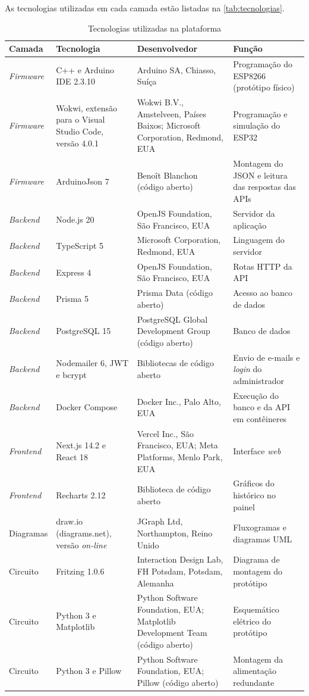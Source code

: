 As tecnologias utilizadas em cada camada estão listadas na
\autoref{tab:tecnologias}.

\begin{table}[H]
\centering
\caption{Tecnologias utilizadas na plataforma}
\label{tab:tecnologias}
\small
\begin{tabular}{p{1.7cm}p{3.4cm}p{4.6cm}p{4.3cm}}
\hline
\textbf{Camada} & \textbf{Tecnologia} & \textbf{Desenvolvedor} & \textbf{Função} \\
\hline
\textit{Firmware} & C++ e Arduino IDE 2.3.10 & Arduino SA, Chiasso, Suíça & Programação do ESP8266 (protótipo físico) \\
\textit{Firmware} & Wokwi, extensão para o Visual Studio Code, versão 4.0.1 & Wokwi B.V., Amstelveen, Países Baixos; Microsoft Corporation, Redmond, EUA & Programação e simulação do ESP32 \\
\textit{Firmware} & ArduinoJson 7 & Benoît Blanchon (código aberto) & Montagem do JSON e leitura das respostas das APIs \\
\textit{Backend} & Node.js 20 & OpenJS Foundation, São Francisco, EUA & Servidor da aplicação \\
\textit{Backend} & TypeScript 5 & Microsoft Corporation, Redmond, EUA & Linguagem do servidor \\
\textit{Backend} & Express 4 & OpenJS Foundation, São Francisco, EUA & Rotas HTTP da API \\
\textit{Backend} & Prisma 5 & Prisma Data (código aberto) & Acesso ao banco de dados \\
\textit{Backend} & PostgreSQL 15 & PostgreSQL Global Development Group (código aberto) & Banco de dados \\
\textit{Backend} & Nodemailer 6, JWT e bcrypt & Bibliotecas de código aberto & Envio de e-mails e \textit{login} do administrador \\
\textit{Backend} & Docker Compose & Docker Inc., Palo Alto, EUA & Execução do banco e da API em contêineres \\
\textit{Frontend} & Next.js 14.2 e React 18 & Vercel Inc., São Francisco, EUA; Meta Platforms, Menlo Park, EUA & Interface \textit{web} \\
\textit{Frontend} & Recharts 2.12 & Biblioteca de código aberto & Gráficos do histórico no painel \\
Diagramas & draw.io (diagrams.net), versão \textit{on-line} & JGraph Ltd, Northampton, Reino Unido & Fluxogramas e diagramas UML \\
Circuito & Fritzing 1.0.6 & Interaction Design Lab, FH Potsdam, Potsdam, Alemanha & Diagrama de montagem do protótipo \\
Circuito & Python 3 e Matplotlib & Python Software Foundation, EUA; Matplotlib Development Team (código aberto) & Esquemático elétrico do protótipo \\
Circuito & Python 3 e Pillow & Python Software Foundation, EUA; Pillow (código aberto) & Montagem da alimentação redundante \\
\hline
\end{tabular}
\end{table}

